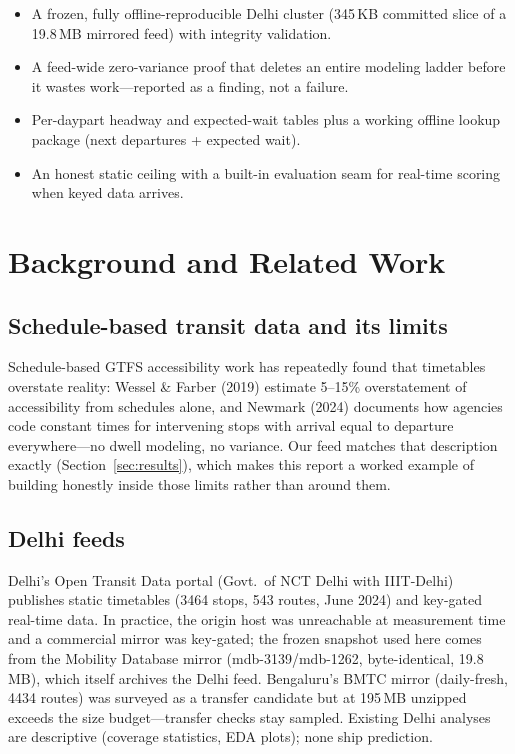 \documentclass[11pt,a4paper]{article}
\begin{document}
\begin{itemize}
    \item A frozen, fully offline-reproducible Delhi cluster (345\,KB committed slice of a 19.8\,MB mirrored feed) with integrity validation.
    \item A feed-wide zero-variance proof that deletes an entire modeling ladder before it wastes work---reported as a finding, not a failure.
    \item Per-daypart headway and expected-wait tables plus a working offline lookup package (next departures + expected wait).
    \item An honest static ceiling with a built-in evaluation seam for real-time scoring when keyed data arrives.
\end{itemize}

\section{Background and Related Work}

\subsection{Schedule-based transit data and its limits}

Schedule-based GTFS accessibility work has repeatedly found that timetables overstate reality: Wessel \& Farber (2019) estimate 5--15\% overstatement of accessibility from schedules alone, and Newmark (2024) documents how agencies code constant times for intervening stops with arrival equal to departure everywhere---no dwell modeling, no variance. Our feed matches that description exactly (Section~\ref{sec:results}), which makes this report a worked example of building honestly inside those limits rather than around them.

\subsection{Delhi feeds}

Delhi's Open Transit Data portal (Govt.\ of NCT Delhi with IIIT-Delhi) publishes static timetables (3464 stops, 543 routes, June 2024) and key-gated real-time data. In practice, the origin host was unreachable at measurement time and a commercial mirror was key-gated; the frozen snapshot used here comes from the Mobility Database mirror (mdb-3139/mdb-1262, byte-identical, 19.8\,MB), which itself archives the Delhi feed. Bengaluru's BMTC mirror (daily-fresh, 4434 routes) was surveyed as a transfer candidate but at 195\,MB unzipped exceeds the size budget---transfer checks stay sampled. Existing Delhi analyses are descriptive (coverage statistics, EDA plots); none ship prediction.
\end{document}
